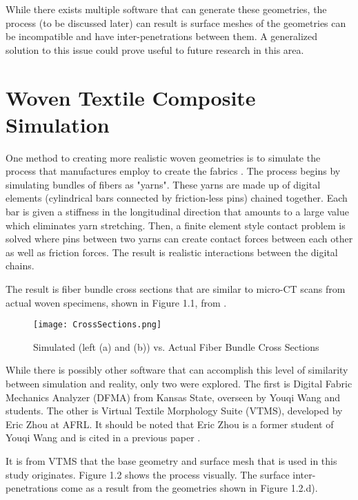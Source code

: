 While there exists multiple software that can generate these geometries, the process (to be discussed later) can result is surface meshes of the geometries can be incompatible and have inter-penetrations between them. A generalized solution to this issue could prove useful to future research in this area.

\section{Woven Textile Composite Simulation}

One method to creating more realistic woven geometries is to simulate the process that manufactures employ to create the fabrics \cite{Wang_Sun1}. The process begins by simulating bundles of fibers as "yarns". These yarns  are made up of digital elements (cylindrical bars connected by friction-less pins) chained together. Each bar is given a stiffness in the longitudinal direction that amounts to a large value which eliminates yarn stretching. Then, a finite element style contact problem is solved where pins between two yarns can create contact forces between each other as well as friction forces. The result is realistic interactions between the digital chains. \cite{Wang_Sun1} 

The result is fiber bundle cross sections that are similar to micro-CT scans from actual woven specimens, shown in Figure 1.1, from \cite{Wang_Sun1}.

\begin{figure}[ht]
\centering
\texttt{[image: CrossSections.png]}
\caption[Simulated vs. Actual Fiber Bundle Cross Sections]{Simulated (left (a) and (b)) vs. Actual Fiber Bundle Cross Sections}

\end{figure}


While there is possibly other software that can accomplish this level of similarity between simulation and reality, only two were explored. The first is Digital Fabric Mechanics Analyzer (DFMA) from Kansas State, overseen by Youqi Wang and students. The other is Virtual Textile Morphology Suite (VTMS), developed by Eric Zhou at AFRL. It should be noted that Eric Zhou is a former student of Youqi Wang and is cited in a previous paper \cite{Wang_Zhou1}.

It is from VTMS that the base geometry and surface mesh that is used in this study originates. Figure 1.2 shows the process visually. The surface inter-penetrations come as a result from the geometries shown in Figure 1.2.d).

